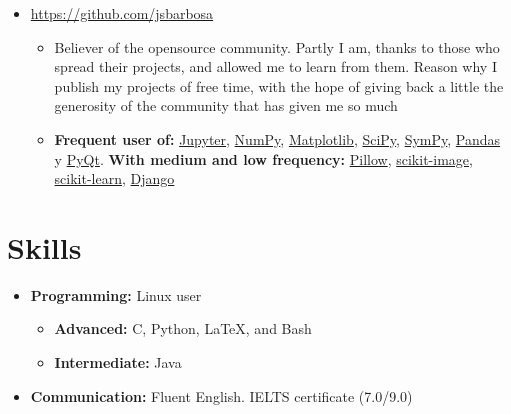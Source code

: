\documentclass[11pt, letterpaper, sans]{moderncv}        %
\begin{document}
\begin{itemize}
		\item{
			{
				\url{https://github.com/jsbarbosa}
				\vspace{3pt}
				\begin{itemize}
					\item Believer of the opensource community. Partly I am, thanks to those who spread their projects, and allowed me to learn from them. Reason why I publish my projects of free time, with the hope of giving back a little the generosity of the community that has given me so much
					\item \textbf{Frequent user of:}
					\href{https://jupyter.org/}{Jupyter}, \href{https://www.numpy.org/}{NumPy}, \href{https://www.matplotlib.com}{Matplotlib}, \href{https://www.scipy.org/}{SciPy}, \href{https://www.sympy.org/en/index.html}{SymPy}, \href{https://pandas.pydata.org/}{Pandas} y \href{https://www.qt.io/}{PyQt}. \textbf{With medium and low frequency:} \href{https://python-pillow.org/}{Pillow}, \href{https://scikit-image.org/}{scikit-image}, \href{https://scikit-learn.org/stable/}{scikit-learn}, \href{https://www.djangoproject.com/}{Django}
				\end{itemize}
			}
		}
	\end{itemize}

\section{Skills}
\vspace{6pt}

\begin{itemize}
	\item \textbf{Programming:} Linux user
	\begin{itemize}
		\item \textbf{Advanced:} C, Python, \LaTeX, and Bash
		\item \textbf{Intermediate:} Java
	\end{itemize} 	
	\vspace{6pt}
	\item \textbf{Communication:} Fluent English. IELTS certificate (7.0/9.0)
	
	
\end{itemize}

\vfill
\enlargethispage{\footskip}
\let\thefootnote\relax{}
\end{document}
